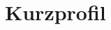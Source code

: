 \section{Kurzprofil}
    \begin{itemize}[leftmargin=0in, label={}]
	\small{\item{\strut
		
	}}
    \end{itemize}

